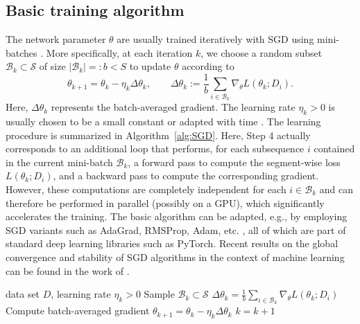 \documentclass{article} %
\begin{document}
\subsection{Basic training algorithm}\label{sec:algorithm}

The network parameter $\theta$ are usually trained iteratively with SGD using mini-batches \citep{Lipton2015,Hewamalage2021,Tian2023}. More specifically, at each iteration $k$, we choose a random subset $\mathcal{B}_k\subset\mathcal{S}$ of size $|\mathcal{B}_k| =: b< S$ to update $\theta$ according to
\begin{equation}
	\theta_{k+1} = \theta_{k} - \eta_k\Delta\theta_k,
	\qquad 
	\Delta\theta_k := \frac{1}{b}\sum_{i\in\mathcal{B}_k}\nabla_\theta L(\theta_{k};D_i).\label{eq:SGD2}
\end{equation}
Here, $\Delta\theta_k$ represents the batch-averaged gradient. The learning rate $\eta_k>0$ is usually chosen to be a small constant or adapted with time \citep{Tian2023}.
The learning procedure is summarized in Algorithm~\ref{alg:SGD}.
Here, Step 4 actually corresponds to an additional loop that performs, for each subsequence $i$ contained in the current mini-batch $\mathcal{B}_k$, a forward pass to compute the segment-wise loss $L(\theta_k;D_i)$, and a backward pass to compute the corresponding gradient. However, these computations are completely independent for each $i\in\mathcal{B}_k$ and can therefore be performed in parallel (possibly on a GPU), which significantly accelerates the training.
The basic algorithm can be adapted, e.g., by employing SGD variants such as AdaGrad, RMSProp, Adam, etc. \citep{Tian2023,Bottou2007,Kingma2015}, all of which are part of standard deep learning libraries such as PyTorch.
Recent results on the global convergence and stability of SGD algorithms in the context of machine learning can be found in the work of \citet{Patel2022,AllenZhu2019}.

\begin{algorithm}
	\caption{RNN training using TBPTT with mini-batch SGD}
	\label{alg:SGD}
	\begin{algorithmic}[1]
		\Require data set $D$, learning rate $\eta_k>0$
		\State Sample $\mathcal{B}_k\subset \mathcal{S}$ 
		\State $\Delta\theta_k = \frac{1}{b}\sum_{i\in\mathcal{B}_k}\nabla_\theta L(\theta_{k};D_i)$ \Comment Compute batch-averaged gradient
		\State $\theta_{k+1} = \theta_{k} - \eta_k\Delta\theta_k$  
		\State $k=k+1$
		\EndWhile
	\end{algorithmic}
\end{algorithm}
\end{document}
